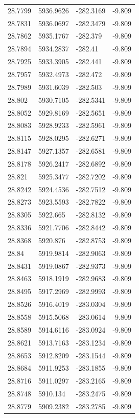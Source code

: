\begin{table}[H]
\begin{tabular}{llll}
28.7799 & 5936.9626 & -282.3169 & -9.809 \\
28.7831 & 5936.0697 & -282.3479 & -9.809 \\
28.7862 & 5935.1767 & -282.379 & -9.809 \\
28.7894 & 5934.2837 & -282.41 & -9.809 \\
28.7925 & 5933.3905 & -282.441 & -9.809 \\
28.7957 & 5932.4973 & -282.472 & -9.809 \\
28.7989 & 5931.6039 & -282.503 & -9.809 \\
28.802 & 5930.7105 & -282.5341 & -9.809 \\
28.8052 & 5929.8169 & -282.5651 & -9.809 \\
28.8083 & 5928.9233 & -282.5961 & -9.809 \\
28.8115 & 5928.0295 & -282.6271 & -9.809 \\
28.8147 & 5927.1357 & -282.6581 & -9.809 \\
28.8178 & 5926.2417 & -282.6892 & -9.809 \\
28.821 & 5925.3477 & -282.7202 & -9.809 \\
28.8242 & 5924.4536 & -282.7512 & -9.809 \\
28.8273 & 5923.5593 & -282.7822 & -9.809 \\
28.8305 & 5922.665 & -282.8132 & -9.809 \\
28.8336 & 5921.7706 & -282.8442 & -9.809 \\
28.8368 & 5920.876 & -282.8753 & -9.809 \\
28.84 & 5919.9814 & -282.9063 & -9.809 \\
28.8431 & 5919.0867 & -282.9373 & -9.809 \\
28.8463 & 5918.1919 & -282.9683 & -9.809 \\
28.8495 & 5917.2969 & -282.9993 & -9.809 \\
28.8526 & 5916.4019 & -283.0304 & -9.809 \\
28.8558 & 5915.5068 & -283.0614 & -9.809 \\
28.8589 & 5914.6116 & -283.0924 & -9.809 \\
28.8621 & 5913.7163 & -283.1234 & -9.809 \\
28.8653 & 5912.8209 & -283.1544 & -9.809 \\
28.8684 & 5911.9253 & -283.1855 & -9.809 \\
28.8716 & 5911.0297 & -283.2165 & -9.809 \\
28.8748 & 5910.134 & -283.2475 & -9.809 \\
28.8779 & 5909.2382 & -283.2785 & -9.809 \\

\end{tabular}
\end{table}

